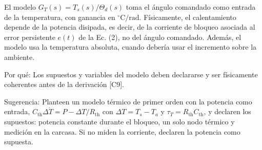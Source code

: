 \documentclass{LabDSTresponse}
\begin{document}
{El modelo $G_T(s) = T_s(s)/\Theta_d(s)$ toma el ángulo comandado como entrada de la temperatura, con ganancia en $^\circ\text{C/rad}$. Físicamente, el calentamiento depende de la potencia disipada, es decir, de la corriente de bloqueo asociada al error persistente $e(t)$ de la Ec. (2), no del ángulo comandado. Además, el modelo usa la temperatura absoluta, cuando debería usar el incremento sobre la ambiente.

Por qué: Los supuestos y variables del modelo deben declararse y ser físicamente coherentes antes de la derivación [C9].

Sugerencia: Planteen un modelo térmico de primer orden con la potencia como entrada, $C_{\text{th}}\Delta\dot{T} = P - \Delta T/R_{\text{th}}$ con $\Delta T = T_s - T_a$ y $\tau_T = R_{\text{th}}C_{\text{th}}$, y declaren los supuestos: potencia constante durante el bloqueo, un solo nodo térmico y medición en la carcasa. Si no miden la corriente, declaren la potencia como supuesta.}
\end{document}

